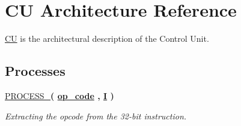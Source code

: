 \hypertarget{class_c_unit_1_1_c_u}{\section{C\-U Architecture Reference}
\label{class_c_unit_1_1_c_u}
}


\hyperlink{class_c_unit_1_1_c_u}{C\-U} is the architectural description of the Control Unit.  


\subsection*{Processes}
 \begin{DoxyCompactItemize}
\item 
\hypertarget{class_c_unit_1_1_c_u_a14098fa528925c40a4e31e81a5783afa}{\hyperlink{class_c_unit_1_1_c_u_a14098fa528925c40a4e31e81a5783afa}{P\-R\-O\-C\-E\-S\-S\-\_}{\bfseries  ( {\bfseries {\bfseries \hyperlink{class_c_unit_1_1_c_u_a6f3dbf2da02fe7917066d92bf3f32032}{op\-\_\-code}} \textcolor{vhdlchar}{ }\textcolor{vhdlchar}{ }\textcolor{vhdlchar}{ }} , {\bfseries {\bfseries \hyperlink{class_c_unit_1_1_c_u_acc0e964d67e878c4c363942b522e297c}{I}} \textcolor{vhdlchar}{ }} )}}\label{class_c_unit_1_1_c_u_a14098fa528925c40a4e31e81a5783afa}

\begin{DoxyCompactList}\small\item\em Extracting the opcode from the 32-\/bit instruction. \end{DoxyCompactList}\end{DoxyCompactItemize}
